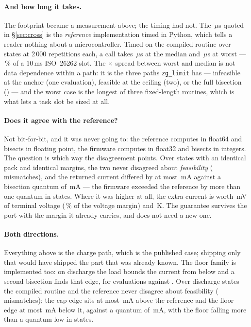 \documentclass[11pt,letterpaper]{article}
\theoremstyle{definition}
\theoremstyle{remark}
\begin{document}
\paragraph{And how long it takes.} The footprint became a measurement above; the timing had not.
The \worstLatency\,$\mu$s quoted in \S\ref{sec:cross} is the \emph{reference} implementation
timed in Python, which tells a reader nothing about a microcontroller. Timed on the compiled
routine over \fwBenchStates{} states at 2\,000 repetitions each, a call takes \fwUsMed\,$\mu$s at
the median and \fwUsMax\,$\mu$s at worst --- \fwSlotPct\,\% of a 10\,ms ISO~26262 slot. The
\fwSpread$\times$ spread between worst and median is not data dependence within a path: it is the
three paths \texttt{zg\_limit} has --- infeasible at the anchor (one evaluation), feasible at the
ceiling (two), or the full bisection (\fwEvals) --- and the worst case is the longest of three
fixed-length routines, which is what lets a task slot be sized at all.

\paragraph{Does it agree with the reference?} Not bit-for-bit, and it was never going to: the
reference computes in float64 and bisects in floating point, the firmware computes in float32
and bisects in integers. The question is which way the disagreement points. Over \fwStates{}
states with an identical pack and identical margins, the two never disagreed about
\emph{feasibility} (\fwMismatch{} mismatches), and the returned current differed by at most
\fwMaxDev\,mA against a bisection quantum of \fwQuantum\,mA --- the firmware exceeded the
reference by more than one quantum in \fwAbove{} states. Where it was higher at all, the extra
current is worth \fwVcost\,mV of terminal voltage (\fwVfrac\,\% of the voltage margin) and
\fwTcost\,K. The guarantee survives the port with the margin it already carries, and does not
need a new one.

\paragraph{Both directions.} Everything above is the charge path, which is the published
case; shipping only that would have shipped the part that was already known. The floor family is
implemented too: on discharge the load bounds the current from below and a second bisection finds
that edge, for \fwDisEvals{} evaluations against \fwEvals. Over \fwDisStates{} discharge states
the compiled routine and the reference never disagree about feasibility (\fwDisMismatch{}
mismatches); the cap edge sits at most \fwDisHi\,mA above the reference and the floor edge at most
\fwDisLo\,mA below it, against a quantum of \fwDisQ\,mA, with the floor falling more than a
quantum low in \fwDisBelow{} states.
\end{document}
